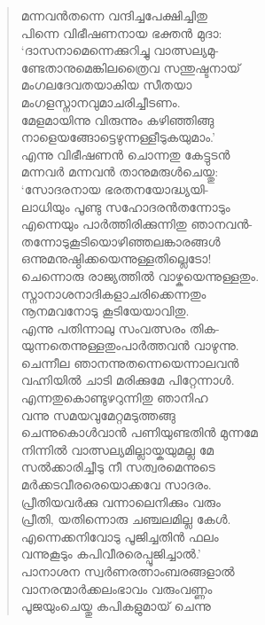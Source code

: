 \begin{verse}
മന്നവന്‍തന്നെ വന്ദിച്ചപേക്ഷിച്ചിതു\\
പിന്നെ വിഭീഷണനായ ഭക്തന്‍ മുദാ:\\
‘ദാസനാമെന്നെക്കുറിച്ചു വാത്സല്യമു-\\
ണ്ടേതാനുമെങ്കിലത്രൈവ സന്തുഷ്ടനായ്\\
മംഗലദേവതയാകിയ സീതയാ\\
മംഗളസ്നാനവുമാചരിച്ചീടണം.\\
മേളമായിന്നു വിരുന്നും കഴിഞ്ഞിങ്ങു\\
നാളെയങ്ങോട്ടെഴുന്നള്ളീടുകയുമാം.’\\
എന്നു വിഭീഷണന്‍ ചൊന്നതു കേട്ടുടന്‍\\
മന്നവര്‍ മന്നവന്‍ താനുമരുള്‍ചെയ്തു:\\
‘സോദരനായ ഭരതനയോദ്ധ്യയി-\\
ലാധിയും പൂണ്ടു സഹോദരന്‍തന്നോടും\\
എന്നെയും പാര്‍ത്തിരിക്കുന്നിതു ഞാനവന്‍-\\
തന്നോടുകൂടിയൊഴിഞ്ഞലങ്കാരങ്ങള്‍\\
ഒന്നുമനുഷ്ഠിക്കയെന്നുള്ളതില്ലെടോ!\\
ചെന്നൊരു രാജ്യത്തില്‍ വാഴ്കയെന്നുള്ളതും.\\
സ്നാനാശനാദികളാചരിക്കെന്നതും\\
നൂനമവനോടു കൂടിയേയാവിതു.\\
എന്നു പതിന്നാലു സംവത്സരം തിക-\\
യുന്നതെന്നുള്ളതുംപാര്‍ത്തവന്‍ വാഴുന്നു.\\
ചെന്നീല ഞാനന്നുതന്നെയെന്നാലവന്‍\\
വഹ്നിയില്‍ ചാടി മരിക്കുമേ പിറ്റേന്നാള്‍.\\
എന്നതുകൊണ്ടുഴറുന്നിതു ഞാനിഹ\\
വന്നു സമയവുമേറ്റമടുത്തങ്ങു\\
ചെന്നുകൊള്‍വാന്‍ പണിയുണ്ടതിന്‍ മുന്നമേ\\
നിന്നില്‍ വാത്സല്യമില്ലായ്കയുമല്ല മേ\\
സല്‍ക്കാരിച്ചീടു നീ സത്വരമെന്നുടെ\\
മര്‍ക്കടവീരരെയൊക്കവേ സാദരം.\\
പ്രീതിയവര്‍ക്കു വന്നാലെനിക്കും വരും\\
പ്രീതി, യതിന്നൊരു ചഞ്ചലമില്ല കേള്‍.\\
എന്നെക്കനിവോടു പൂജിച്ചതിന്‍ ഫലം\\
വന്നുകൂടും കപിവീരരെപ്പൂജിച്ചാല്‍.’\\
പാനാശന സ്വര്‍ണരത്നാംബരങ്ങളാല്‍\\
വാനരന്മാര്‍ക്കലംഭാവം വരുംവണ്ണം\\
പൂജയുംചെയ്തു കപികളുമായ് ചെന്നു\\

\end{verse}
